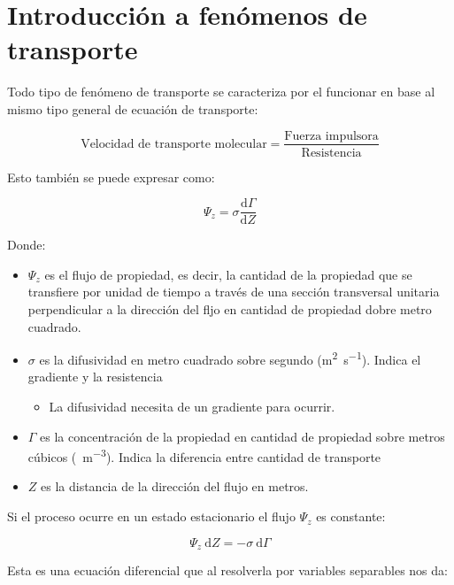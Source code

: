 \documentclass{AsignaturaResumen}
\begin{document}
    \chapter{Introducción a fenómenos de transporte}
\fi

Todo tipo de fenómeno de transporte se caracteriza por el funcionar en base al mismo tipo general de ecuación de transporte:

\begin{equation}
    \text{Velocidad de transporte molecular} = \frac{\text{Fuerza impulsora}}{\text{Resistencia}}
\end{equation}

Esto también se puede expresar como:

\begin{equation}\label{eq:ecuacion_de_transporte_molecular_diferencial}
    \Psi_{z} = \sigma\frac{\mathrm{d}\Gamma}{\mathrm{d}Z}
\end{equation}

Donde:

\begin{itemize}
    \item $\Psi_{z}$ es el flujo de propiedad, es decir, la cantidad de la propiedad que se transfiere por unidad de tiempo a través de una sección transversal unitaria perpendicular a la dirección del fljo en cantidad de propiedad dobre metro cuadrado.
    \item $\sigma$ es la difusividad en metro cuadrado sobre segundo (\unit{\m\squared\per\s}). Indica el gradiente y la resistencia
    \begin{itemize}
        \item La difusividad necesita de un gradiente para ocurrir.
    \end{itemize}
    \item $\Gamma$ es la concentración de la propiedad en cantidad de propiedad sobre metros cúbicos (\unit{\substance\per\m\cubed}). Indica la diferencia entre cantidad de transporte
    \item $Z$ es la distancia de la dirección del flujo en metros.
\end{itemize}

Si el proceso ocurre en un estado estacionario el flujo $\Psi_{z}$ es constante:

\begin{equation*}
    \Psi_{z} \ \mathrm{d}Z = - \sigma \ \mathrm{d}\Gamma
\end{equation*}

Esta es una ecuación diferencial que al resolverla por variables separables nos da:
\end{document}
